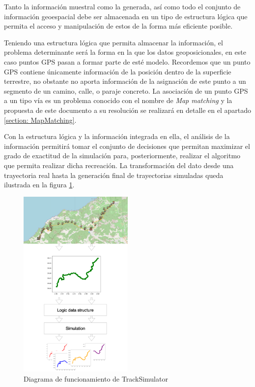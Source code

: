 Tanto la información muestral como la generada, así como todo el conjunto de información geoespacial debe 
ser almacenada en un tipo de estructura lógica que permita el acceso y manipulación de estos de la forma 
más eficiente posible. 

Teniendo una estructura lógica que permita almacenar la información, el problema determinante será la 
forma en la que los datos geoposicionales, en este caso puntos \ac{GPS} pasan a formar parte de esté 
modelo. Recordemos que un punto \ac{GPS} contiene únicamente información de la posición dentro de la
superficie terrestre, no obstante no aporta información de la asignación de este punto a un segmento de
un camino, calle, o paraje concreto. La asociación de un punto \ac{GPS} a un tipo vía es un problema conocido 
con el nombre de \textit{Map matching} y la propuesta de este documento a su resolución se realizará en 
detalle en el apartado \ref{section: MapMatching}.

Con la estructura lógica y la información integrada en ella, el análisis de la información permitirá tomar 
el conjunto de decisiones que permitan maximizar el grado de exactitud de la simulación para, 
posteriormente, realizar el algoritmo que permita realizar dicha recreación. La transformación del dato desde una trayectoria real hasta la generación final de trayectorias simuladas queda ilustrada en la figura \ref{figure:TrackSimulatorDiagram}.
\begin{figure}[!htb]
\begin{center}
\includegraphics[width=0.5\textwidth]{./Imagenes/TrackSimulatorStructure.png}
\caption{Diagrama de funcionamiento de TrackSimulator}
\label{figure:TrackSimulatorDiagram}
\end{center}
\end{figure}
\newpage
 
